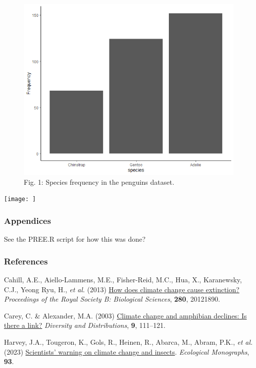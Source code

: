 \documentclass[
]{article}
\newlength{\cslhangindent}
\newlength{\cslentryspacingunit} %
\newenvironment{CSLReferences}[2] %
 {%
  \setlength{\parindent}{0pt}
  \ifodd #1
  \let\oldpar\par
  \def\par{\hangindent=\cslhangindent\oldpar}
  \fi
  \setlength{\parskip}{#2\cslentryspacingunit}
 }%
 {}
\begin{document}
\begin{figure}
\centering
\includegraphics{images/frequency_bar.png}
\caption{Fig. 1: Species frequency in the penguins dataset.}
\end{figure}

\texttt{[image: ]}

\hypertarget{appendices}{%
\subsubsection{Appendices}\label{appendices}}

See the PREE.R script for how this was done?

\hypertarget{references}{%
\subsubsection*{References}\label{references}}

\hypertarget{refs}{}
\begin{CSLReferences}{0}{0}
\leavevmode{}%
Cahill, A.E., Aiello-Lammens, M.E., Fisher-Reid, M.C., Hua, X.,
Karanewsky, C.J., Yeong Ryu, H., \emph{et al.} (2013)
\href{https://doi.org/10.1098/rspb.2012.1890}{How does climate change
cause extinction?} \emph{Proceedings of the Royal Society B: Biological
Sciences}, \textbf{280}, 20121890.

\leavevmode{}%
Carey, C. \& Alexander, M.A. (2003)
\href{https://www.jstor.org/stable/3246804}{Climate change and amphibian
declines: Is there a link?} \emph{Diversity and Distributions},
\textbf{9}, 111--121.

\leavevmode{}%
Harvey, J.A., Tougeron, K., Gols, R., Heinen, R., Abarca, M., Abram,
P.K., \emph{et al.} (2023)
\href{https://doi.org/10.1002/ecm.1553}{Scientists' warning on climate
change and insects}. \emph{Ecological Monographs}, \textbf{93}.

\end{CSLReferences}
\end{document}
